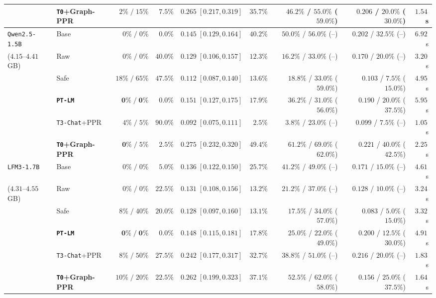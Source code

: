 \documentclass{article}
\begin{document}
\begin{table}[t]
\begin{center}
\begin{tabular}{llrrrrrrr}
 & \textbf{\texttt{T0}+Graph-PPR} & $2\%\;/\;15\%$ & $7.5\%$ & $\mathbf{0.265\;[0.217, 0.319]}$ & $35.7\%$ & $\mathbf{46.2\%}$ / $\mathbf{55.0\%}$ ($\mathbf{59.0\%}$) & $0.206$ / $20.0\%$ ($30.0\%$) & $\mathbf{1.54}$\,s \\
\midrule
\texttt{Qwen2.5-1.5B} & Base & $0\%\;/\;0\%$ & $0.0\%$ & $0.145\;[0.129, 0.164]$ & $40.2\%$ & $50.0\%$ / $56.0\%$ (--) & $0.202$ / $32.5\%$ (--) & $6.92$\,s \\
($4.15$--$4.41$\,GB) & Raw & $0\%\;/\;0\%$ & $40.0\%$ & $0.129\;[0.106, 0.157]$ & $12.3\%$ & $16.2\%$ / $33.0\%$ (--) & $0.170$ / $20.0\%$ (--) & $3.20$\,s \\
 & Safe & $18\%\;/\;65\%$ & $47.5\%$ & $0.112\;[0.087, 0.140]$ & $13.6\%$ & $18.8\%$ / $33.0\%$ ($59.0\%$) & $0.103$ / $7.5\%$ ($15.0\%$) & $4.95$\,s \\
 & \textbf{\texttt{PT-LM}} & $\mathbf{0\%\;/\;0\%}$ & $\mathbf{0.0\%}$ & $0.151\;[0.127, 0.175]$ & $17.9\%$ & $36.2\%$ / $31.0\%$ ($56.0\%$) & $0.190$ / $20.0\%$ ($37.5\%$) & $5.95$\,s \\
 & \texttt{T3-Chat}+PPR & $4\%\;/\;5\%$ & $90.0\%$ & $0.092\;[0.075, 0.111]$ & $2.5\%$ & $3.8\%$ / $23.0\%$ (--) & $0.099$ / $7.5\%$ (--) & $1.05$\,s \\
 & \textbf{\texttt{T0}+Graph-PPR} & $\mathbf{0\%}\;/\;5\%$ & $2.5\%$ & $\mathbf{0.275\;[0.232, 0.320]}$ & $\mathbf{49.4\%}$ & $\mathbf{61.2\%}$ / $\mathbf{69.0\%}$ ($\mathbf{62.0\%}$) & $\mathbf{0.221}$ / $\mathbf{40.0\%}$ ($\mathbf{42.5\%}$) & $\mathbf{2.25}$\,s \\
\midrule
\texttt{LFM3-1.7B} & Base & $0\%\;/\;0\%$ & $5.0\%$ & $0.136\;[0.122, 0.150]$ & $25.7\%$ & $41.2\%$ / $49.0\%$ (--) & $0.171$ / $15.0\%$ (--) & $4.61$\,s \\
($4.31$--$4.55$\,GB) & Raw & $0\%\;/\;0\%$ & $22.5\%$ & $0.131\;[0.108, 0.156]$ & $13.2\%$ & $21.2\%$ / $37.0\%$ (--) & $0.128$ / $10.0\%$ (--) & $3.24$\,s \\
 & Safe & $8\%\;/\;40\%$ & $20.0\%$ & $0.128\;[0.097, 0.160]$ & $13.1\%$ & $17.5\%$ / $34.0\%$ ($57.0\%$) & $0.083$ / $5.0\%$ ($15.0\%$) & $3.32$\,s \\
 & \textbf{\texttt{PT-LM}} & $\mathbf{0\%\;/\;0\%}$ & $\mathbf{0.0\%}$ & $0.148\;[0.115, 0.181]$ & $17.8\%$ & $25.0\%$ / $22.0\%$ ($49.0\%$) & $0.200$ / $12.5\%$ ($30.0\%$) & $4.91$\,s \\
 & \texttt{T3-Chat}+PPR & $8\%\;/\;50\%$ & $27.5\%$ & $0.242\;[0.177, 0.317]$ & $32.7\%$ & $38.8\%$ / $51.0\%$ (--) & $\mathbf{0.216}$ / $20.0\%$ (--) & $1.83$\,s \\
 & \textbf{\texttt{T0}+Graph-PPR} & $10\%\;/\;20\%$ & $22.5\%$ & $\mathbf{0.262\;[0.199, 0.323]}$ & $\mathbf{37.1\%}$ & $\mathbf{52.5\%}$ / $\mathbf{62.0\%}$ ($\mathbf{58.0\%}$) & $0.156$ / $\mathbf{25.0\%}$ ($\mathbf{37.5\%}$) & $\mathbf{1.64}$\,s \\
\bottomrule
\end{tabular}
\end{center}
\vskip -0.14in
\end{table}
\end{document}
